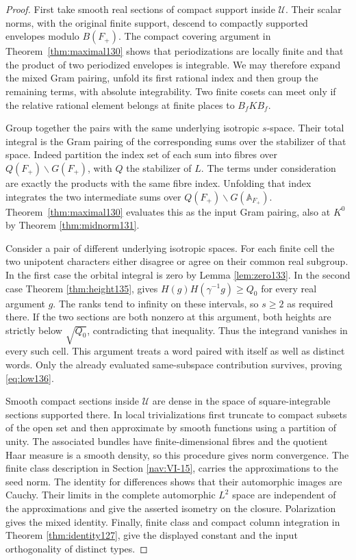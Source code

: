 \documentclass[a4paper,11pt]{article}
\theoremstyle{definition}
\theoremstyle{remark}
\numberwithin{equation}{section}
\begin{document}
\begin{proof}
First take smooth real sections of compact support inside
\(\mathcal U\). Their scalar norms, with the original finite
support, descend to compactly supported envelopes modulo \(B(F_+)\).
The compact covering argument in Theorem~\ref{thm:maximal130}
shows that periodizations are locally finite and that the
product of two periodized envelopes is integrable. We may
therefore expand the mixed Gram pairing, unfold its first
rational index and then group the remaining terms, with absolute
integrability. Two finite cosets can meet only if the relative
rational element belongs at finite places to \(B_fKB_f\).

Group together the pairs with the same underlying isotropic
\(s\)-space. Their total integral is the Gram pairing of the
corresponding sums over the stabilizer of that space. Indeed
partition the index set of each sum into fibres over
\(Q(F_+)\backslash G(F_+)\), with \(Q\) the stabilizer of \(L\).
The terms under consideration are exactly the products with the
same fibre index. Unfolding that index integrates the two
intermediate sums over \(Q(F_+)\backslash G(\mathbb A_{F_+})\).
Theorem~\ref{thm:maximal130} evaluates this as the input Gram
pairing, also at \(K^0\) by Theorem \ref{thm:midnorm131}.

Consider a pair of different underlying isotropic spaces.
For each finite cell the two unipotent characters either
disagree or agree on their common real subgroup. In the first
case the orbital integral is zero by Lemma \ref{lem:zero133}.
In the second case Theorem \ref{thm:height135}, gives
\(H(g)H(\gamma^{-1}g)\ge Q_0\) for every real argument \(g\).
The ranks tend to infinity on these intervals, so \(s\ge2\)
as required there. If the two sections are both nonzero at this
argument, both heights are strictly below \(\sqrt{Q_0}\),
contradicting that inequality. Thus the integrand vanishes in
every such cell. This argument treats a word paired with itself
as well as distinct words. Only the already evaluated
same-subspace contribution survives, proving \eqref{eq:low136}.

Smooth compact sections inside \(\mathcal U\) are dense in the
space of square-integrable sections supported there. In local
trivializations first truncate to compact subsets of the open set
and then approximate by smooth functions using a partition of
unity. The associated bundles have finite-dimensional fibres
and the quotient Haar measure is a smooth density, so this
procedure gives norm convergence. The finite class description
in Section \ref{nav:VI-15}, carries the approximations to the
seed norm. The identity for differences shows that their
automorphic images are Cauchy. Their limits in the complete
automorphic \(L^2\) space are independent of the approximations
and give the asserted isometry on the closure. Polarization
gives the mixed identity. Finally, finite class and compact
column integration in Theorem \ref{thm:identity127}, give the displayed
constant and the input orthogonality of distinct types.
\end{proof}
\end{document}
